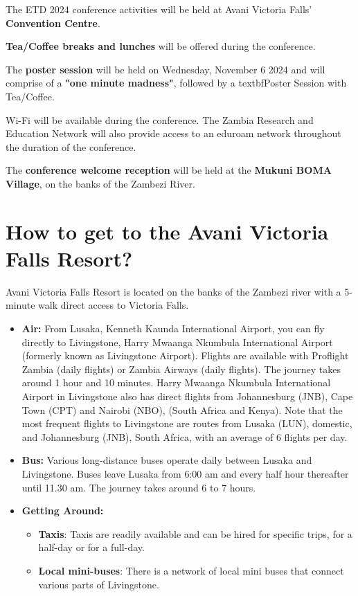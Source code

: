 The ETD 2024 conference activities will be held at Avani Victoria Falls' \textbf{Convention Centre}.

\textbf{Tea/Coffee breaks and lunches} will be offered during the conference.

The \textbf{poster session} will be held on Wednesday, November 6 2024 and will comprise of a \textbf{"one minute madness"}, followed by a textbf{Poster Session with Tea/Coffee}.

Wi-Fi will be available during the conference. The Zambia Research and Education Network will also provide access to an eduroam network throughout the duration of the conference.

The \textbf{conference welcome reception} will be held at the \textbf{Mukuni BOMA Village}, on the banks of the Zambezi River.

\section{How to get to the Avani Victoria Falls Resort?}

Avani Victoria Falls Resort is located on the banks of the Zambezi river with a 5-minute walk direct access to Victoria Falls.

\begin{itemize}

	\item \textbf{Air:} From Lusaka, Kenneth Kaunda International Airport, you can fly directly to Livingstone, Harry Mwaanga Nkumbula International Airport (formerly known as Livingstone Airport). Flights are available with Proflight Zambia (daily flights) or Zambia Airways (daily flights). The journey takes around 1 hour and 10 minutes. Harry Mwaanga Nkumbula International Airport in Livingstone also has direct flights from Johannesburg (JNB), Cape Town (CPT) and Nairobi (NBO), (South Africa and Kenya). Note that the most frequent flights to Livingstone are routes from Lusaka (LUN), domestic, and Johannesburg (JNB), South Africa, with an average of 6 flights per day.
	\item \textbf{Bus:} Various long-distance buses operate daily between Lusaka and Livingstone. Buses leave Lusaka from 6:00 am and every half hour thereafter until 11.30 am. The journey takes around 6 to 7 hours.
	\item \textbf{Getting Around:}
	\begin{itemize}
	    \item \textbf{Taxis}: Taxis are readily available and can be hired for specific trips, for a half-day or for a full-day.
        \item \textbf{Local mini-buses}: There is a network of local mini buses that connect various parts of Livingstone.
    \end{itemize}
	
\end{itemize}

